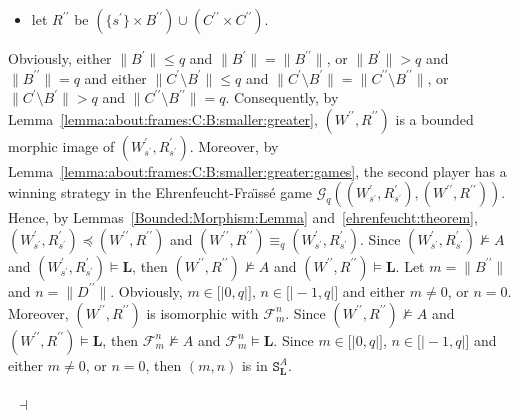 \documentclass[draft]{article}
\newenvironment{proof}{{\bf Proof:}}{~$\dashv$\\}
\def\lsem{{\lbrack\mid}}
\def\rsem{{\mid\rbrack}}
\def\L{\mathbf{L}}
\begin{document}
\begin{proof}
\begin{itemize}
%
%
\item let $R^{\prime\prime}$ be $(\{s^{\prime}\}{\times}B^{\prime\prime}){\cup}(C^{\prime\prime}{\times}C^{\prime\prime})$.
%
%
\end{itemize}
%
%
Obviously, either ${\parallel}B^{\prime}{\parallel}{\leq}q$ and ${\parallel}B^{\prime}{\parallel}{=}{\parallel}B^{\prime\prime}{\parallel}$, or ${\parallel}B^{\prime}{\parallel}{>}q$ and ${\parallel}B^{\prime\prime}{\parallel}{=}q$ and either ${\parallel}C^{\prime}{\setminus}B^{\prime}{\parallel}{\leq}q$ and ${\parallel}C^{\prime}{\setminus}B^{\prime}{\parallel}{=}{\parallel}C^{\prime\prime}{\setminus}B^{\prime\prime}{\parallel}$, or ${\parallel}C^{\prime}{\setminus}B^{\prime}{\parallel}{>}q$ and ${\parallel}C^{\prime\prime}{\setminus}B^{\prime\prime}{\parallel}{=}q$.
Consequently, by Lemma~\ref{lemma:about:frames:C:B:smaller:greater}, $(W^{\prime\prime},R^{\prime\prime})$ is a bounded morphic image of $(W^{\prime}_{s^{\prime}},R^{\prime}_{s^{\prime}})$.
Moreover, by Lemma~\ref{lemma:about:frames:C:B:smaller:greater:games}, the second player has a winning strategy in the Ehrenfeucht-Fra\"\i ss\'e game ${\mathcal G}_{q}((W^{\prime}_{s^{\prime}},R^{\prime}_{s^{\prime}}),(W^{\prime\prime},R^{\prime\prime}))$.
Hence, by Lemmas~\ref{Bounded:Morphism:Lemma}
%
%
%
%
%
%
%
%
%
%
%
%
\linebreak
%
%
%
%
%
%
%
%
%
%
%
%
and~\ref{ehrenfeucht:theorem}, $(W^{\prime}_{s^{\prime}},R^{\prime}_{s^{\prime}}){\preceq}(W^{\prime\prime},R^{\prime\prime})$ and $(W^{\prime\prime},R^{\prime\prime}){\equiv_{q}}(W^{\prime}_{s^{\prime}},R^{\prime}_{s^{\prime}})$.
Since $(W^{\prime}_{s^{\prime}},R^{\prime}_{s^{\prime}}){\not\models}A$ and $(W^{\prime}_{s^{\prime}},R^{\prime}_{s^{\prime}}){\models}\L$, then $(W^{\prime\prime},R^{\prime\prime}){\not\models}A$ and $(W^{\prime\prime},R^{\prime\prime}){\models}\L$.
Let $m{=}{\parallel}B^{\prime\prime}{\parallel}$ and $n{=}{\parallel}D^{\prime\prime}{\parallel}$.
Obviously, $m{\in}\lsem0,q\rsem$, $n{\in}\lsem{-}1,q\rsem$ and either $m{\not=}0$, or $n{=}0$.
Moreover, $(W^{\prime\prime},R^{\prime\prime})$ is isomorphic with ${\mathcal F}_{m}^{n}$.
Since $(W^{\prime\prime},R^{\prime\prime}){\not\models}A$ and $(W^{\prime\prime},R^{\prime\prime}){\models}\L$, then ${\mathcal F}_{m}^{n}{\not\models}A$ and ${\mathcal F}_{m}^{n}{\models}\L$.
Since $m{\in}\lsem0,q\rsem$, $n{\in}\lsem{-}1,q\rsem$ and either $m{\not=}0$, or $n{=}0$, then $(m,n)$ is in $\mathtt{S}_{\L}^{A}$.
%
%
\\
\\

\end{proof}
\end{document}
